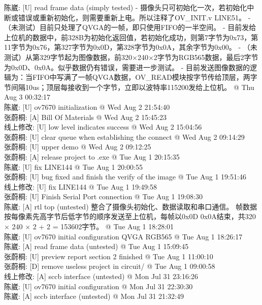 \documentclass[a4paper]{paper}
\begin{document}
陈崴: [U] read frame data (simply tested) 	- 摄像头只可初始化一次，若初始化中断或错误或重新初始化，则需要重新上电。所以注释了OV\_INIT.v LINE51。 	- （未测试）目前只处理了QVGA的一帧，即只使用FIFO的一半空间。 	- 目前发给上位机的数据中，前328B为初始化返回值，若初始化成功，则第7字节为0x73，第11字节为0x76，第327字节为0x0D，第328字节为0x0A，其余字节为0x00。 	- （未测试）从第329字节起为图像数据，前320×240×2字节为RGB565数据，最后2字节为0x0D、0x0A。似乎数据仍有错误，需要进一步测试。 	- 目前发送图像数据的逻辑为：当FIFO中写满了一帧QVGA数据，OV\_READ模块按字节传给顶层，两字节间隔10us；顶层每接收到一个字节，立即以波特率115200发给上位机。 @ Thu Aug 3 00:32:17\\  
陈崴: [U] ov7670 initialization @ Wed Aug 2 21:54:40\\ 
张蔚桐: [A] Bill Of Materials @ Wed Aug 2 15:45:23\\  
线上修改: [U] low level indicates success @ Wed Aug 2 15:04:56\\ 
张蔚桐: [U] clear queue when establishing the connect @ Wed Aug 2 09:14:29\\ 
张蔚桐: [U] upper demo @ Wed Aug 2 09:12:25\\  
张蔚桐: [A] release project to .exe @ Tue Aug 1 20:15:35\\ 
陈崴: [U] fix LINE144 @ Tue Aug 1 20:00:55\\ 
张蔚桐: [U] bug fixed and finish the verify of the image @ Tue Aug 1 19:51:46\\ 
线上修改: [U] fix LINE144 @ Tue Aug 1 19:49:58\\ 
张蔚桐: [U] Finish Serial Port connection @ Tue Aug 1 19:08:30\\ 
陈崴: [A] rtl top (untested) 	整合了摄像头初始化、数据读取和串口通信。 	帧数据按每像素先高字节后低字节的顺序发送至上位机，每帧以0x0D 0x0A结束，共320 × 240 × 2 + 2 = 153602字节。 @ Tue Aug 1 18:28:01\\ 
陈崴: [U] ov7670 initial configuration 	QVGA RGB565 @ Tue Aug 1 18:26:17\\ 
陈崴: [A] read frame data (untested) @ Tue Aug 1 15:09:45\\ 
张蔚桐: [U] preview report section 2 finished @ Tue Aug 1 11:00:10\\ 
张蔚桐: [D] remove useless project in circuit/ @ Tue Aug 1 09:00:58\\ 
线上修改:  [A] sccb interface (untested) @ Mon Jul 31 23:16:26\\ 
陈崴: [U] ov7670 initial configuration @ Mon Jul 31 22:30:30\\ 
陈崴: [A] sccb interface (untested) @ Mon Jul 31 21:32:49\\ 
\end{document}
